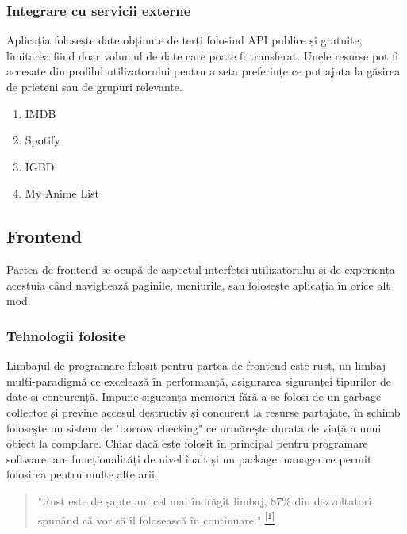 \documentclass{article}
\begin{document}
    \subsubsection{Integrare cu servicii externe}
    \label{Integrare cu servicii externe}
    Aplicația folosește date obținute de terți folosind API publice și gratuite, limitarea fiind doar volumul de date care poate fi transferat. Unele resurse pot fi accesate din profilul utilizatorului pentru a seta preferințe ce pot ajuta la găsirea de prieteni sau de grupuri relevante.

    \begin{enumerate}[noitemsep, leftmargin=0.3cm]
        \item IMDB
        \item Spotify
        \item IGBD
        \item My Anime List
    \end{enumerate}

    \subsection{Frontend}
    \label{Frontend}
    Partea de frontend se ocupă de aspectul interfeței utilizatorului și de experiența acestuia când navighează paginile, meniurile, sau folosește aplicația în orice alt mod.
    \subsubsection{Tehnologii folosite}
    \label{Frontend-tehnologii}
    Limbajul de programare folosit pentru partea de frontend este rust, un limbaj multi-paradigmă ce excelează în performanță, asigurarea siguranței tipurilor de date și concurență. Impune siguranța memoriei fără a se folosi de un garbage collector și previne accesul destructiv și concurent la resurse partajate, în schimb folosește un sistem de "borrow checking" ce urmărește durata de viață a unui obiect la compilare. Chiar dacă este folosit în principal pentru programare software, are funcționalități de nivel înalt și un package manager ce permit folosirea pentru multe alte arii.

    \begin{quote}
        "Rust este de șapte ani cel mai îndrăgit limbaj, 87\% din dezvoltatori spunând că vor să îl folosească în continuare." \hyperref[stackoverflow-studiu-2022]{\textsuperscript{[1]}}
    \end{quote}
\end{document}
